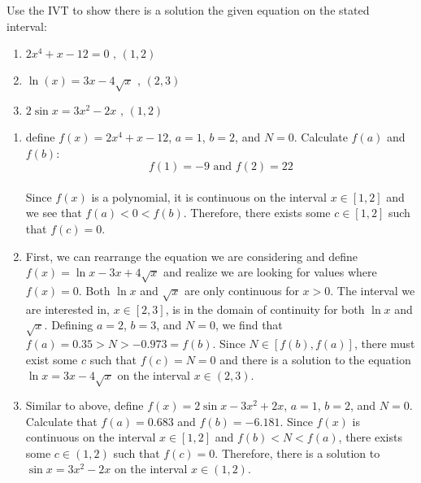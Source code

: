\begin{Exercise}
    [title=Intermediate Value Theorem Practice, label=IVTPrac]
    Use the IVT to show there is a solution the given equation on the stated 
    interval:\
    \begin{enumerate}
        \item $2x^4+x-12=0 \text{ , } \left(1, 2\right)$
        \item $\ln(x)=3x-4\sqrt{x}\text{ , } \left(2, 3\right)$
        \item $2\sin{x} = 3x^2-2x\text{ , } \left(1, 2\right)$
        \vspace{75mm}
    \end{enumerate}
\end{Exercise}
\begin{Answer}
    [ref=IVTPrac]
    \begin{enumerate}
        \item define $f(x)=2x^4+x-12$, $a=1$, $b=2$, and $N=0$. Calculate 
        $f(a)$ and $f(b)$:
        $$f(1)=-9 \text{ and } f(2)=22$$ \\
        Since $f(x)$ is a polynomial, it is continuous on the interval $x\in
        \left[1, 2\right]$ and we see that $f(a) < 0 < f(b)$. Therefore, there 
        exists some $c \in \left[1, 2\right]$ such that $f(c)=0$.\
        
        \item First, we can rearrange the equation we are considering and 
        define $f(x) = \ln{x} - 3x + 4\sqrt{x}$ and realize we are looking for 
        values where $f(x) = 0$. Both $\ln{x}$ and $\sqrt{x}$ are only continuous 
        for $x > 0$. The interval we are interested in, $x \in \left[2, 
        3\right]$, is in the domain of continuity for both $\ln{x}$ and 
        $\sqrt{x}$. Defining $a = 2$, $b = 3$, and $N = 0$, we find that $f(a) 
        = 0.35 > N > -0.973 = f(b)$. Since $N \in \left[f(b), f(a)\right]$, 
        there must exist some $c$ such that $f(c) = N = 0$ and there is a 
        solution to the equation $\ln{x} = 3x - 4\sqrt{x}$ on the interval $x 
        \in \left(2, 3\right)$.
        
        \item Similar to above, define $f(x) = 2\sin{x} - 3x^2 + 2x$, $a = 1$, 
        $b = 2$, and $N = 0$. Calculate that $f(a) = 0.683$ and $f(b) = -6.181$. 
        Since $f(x)$ is continuous on the interval $ x \in \left[1, 2\right]$ 
        and $f(b) < N < f(a)$, there exists some $c \in \left(1, 2 \right)$ 
        such that $f(c) = 0$. Therefore, there is a solution to $\sin{x} = 
        3x^2 - 2x$ on the interval $ x\in \left(1, 2\right)$.
    \end{enumerate}
\end{Answer}

